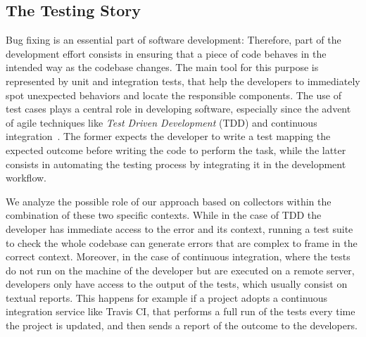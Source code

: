 \subsection{The Testing Story}\label{sec:story-testing}

Bug fixing is an essential part of software development: Therefore, part of the development effort consists in ensuring that a piece of code behaves in the intended way as the codebase changes. The main tool for this purpose is represented by unit and integration tests, that help the developers to immediately spot unexpected behaviors and locate the responsible components. The use of test cases plays a central role in developing software, especially since the advent of agile techniques like \emph{Test Driven Development} (TDD) and continuous integration~\cite{Beck2001manifesto}. The former expects the developer to write a test mapping the expected outcome before writing the code to perform the task, while the latter consists in automating the testing process by integrating it in the development workflow. 

We analyze the possible role of our approach based on collectors within the combination of these two specific contexts. While in the case of TDD the developer has immediate access to the error and its context, running a test suite to check the whole codebase can generate errors that are complex to frame in the correct context.
Moreover, in the case of continuous integration, where the tests do not run on the machine of the developer but are executed on a remote server, developers only have access to the output of the tests, which usually consist on textual reports. This happens for example if a project adopts a continuous integration service like Travis CI, that performs a full run of the tests every time the project is updated, and then sends a report of the outcome to the developers.

